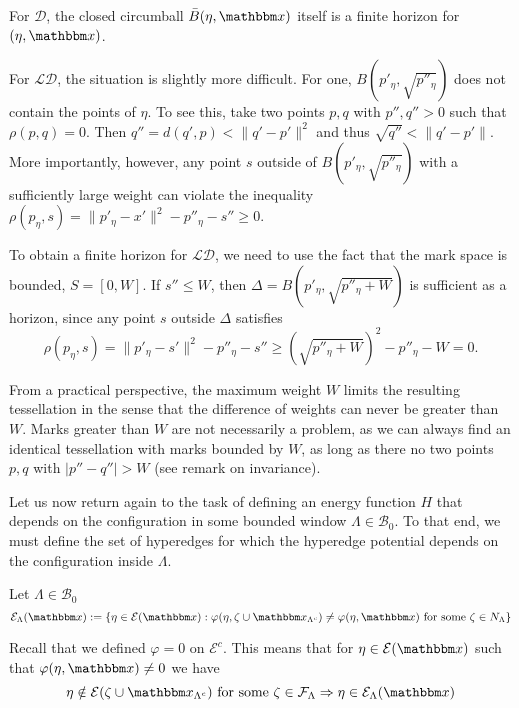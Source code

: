 \begin{remark} 
For $\mathcal D$, the closed circumball $\bar B(\eta,\x)$ itself is a finite horizon for $(\eta,\x)$.

For $\mathcal {LD}$, the situation is slightly more difficult. For one, $B(p'_\eta, \sqrt{p''_\eta})$ does not contain the points of $\eta$. To see this, take two points $p,q$ with $p'',q''>0$ such that $\rho(p,q)=0$. Then $q'' = d(q',p) < \|q'-p'\|^2$ and thus $\sqrt{q''} < \|q'-p'\|$. More importantly, however, any point $s$ outside of $B(p'_\eta, \sqrt{p''_\eta})$ with a sufficiently large weight can violate the inequality $\rho(p_\eta,s) = \|p'_\eta - x'\|^2 - p''_\eta - s'' \geq 0$. 

To obtain a finite horizon for $\mathcal {LD}$, we need to use the fact that the mark space is bounded, $S=[0,W]$. If $s'' \leq W$, then $\Delta = B(p'_\eta, \sqrt{p''_\eta + W})$ is sufficient as a horizon, since any point $s$ outside $\Delta$ satisfies
$$\rho(p_\eta, s) = \|p'_\eta - s'\|^2 - p''_\eta - s'' \geq (\sqrt{p''_\eta+W})^2-p''_\eta-W = 0.$$ 

From a practical perspective, the maximum weight $W$ limits the resulting tessellation in the sense that the difference of weights can never be greater than $W$. Marks greater than $W$ are not necessarily a problem, as we can always find an identical tessellation with marks bounded by $W$, as long as there no two points $p,q$ with $|p''-q''|>W$ (see remark on invariance).
\end{remark}

Let us now return again to the task of defining an energy function $H$ that depends on the configuration in some bounded window $\Lambda \in \mathcal B_0$. To that end, we must define the set of hyperedges for which the hyperedge potential depends on the configuration inside $\Lambda$. 

\begin{definition}\label{def:Eset} Let $\Lambda \in \mathcal B_0$
$$\mathcal E_\Lambda(\x) := \{ \eta \in \mathcal E(\x): \varphi(\eta,\zeta \cup \x_{\Lambda^c}) \neq \varphi(\eta,\x) \text{ for some } \zeta \in N_\Lambda \}$$
\end{definition}

Recall that we defined $\varphi=0$ on $\mathcal E^c$. This means that for $\eta \in \mathcal E(\x)$ such that $\varphi(\eta,\x)\neq 0$ we have
$$\eta \notin \mathcal E(\zeta \cup \x_{\Lambda^c})\text{ for some }\zeta \in \mathcal F_{\Lambda} \Rightarrow \eta \in \mathcal E_{\Lambda}(\x)$$ 

